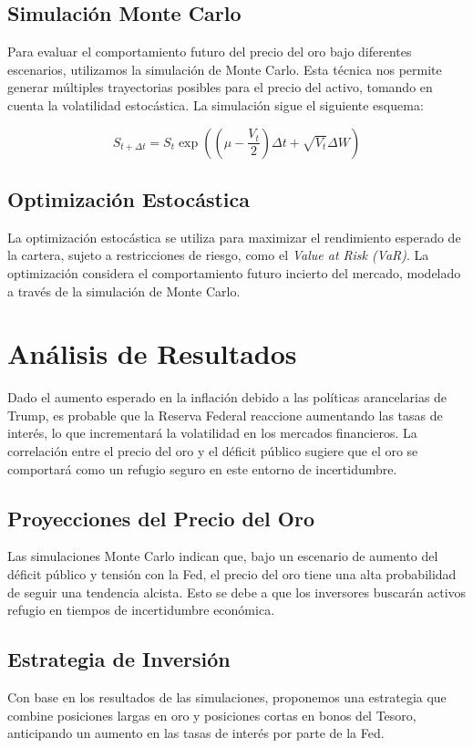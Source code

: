 \documentclass{article}
\begin{document}
\subsection{Simulación Monte Carlo}
Para evaluar el comportamiento futuro del precio del oro bajo diferentes escenarios, utilizamos la simulación de Monte Carlo. Esta técnica nos permite generar múltiples trayectorias posibles para el precio del activo, tomando en cuenta la volatilidad estocástica. La simulación sigue el siguiente esquema:

\[
S_{t+\Delta t} = S_t \exp \left( \left( \mu - \frac{V_t}{2} \right) \Delta t + \sqrt{V_t} \Delta W \right)
\]

\subsection{Optimización Estocástica}
La optimización estocástica se utiliza para maximizar el rendimiento esperado de la cartera, sujeto a restricciones de riesgo, como el \textit{Value at Risk (VaR)}. La optimización considera el comportamiento futuro incierto del mercado, modelado a través de la simulación de Monte Carlo.

\section{Análisis de Resultados}

Dado el aumento esperado en la inflación debido a las políticas arancelarias de Trump, es probable que la Reserva Federal reaccione aumentando las tasas de interés, lo que incrementará la volatilidad en los mercados financieros. La correlación entre el precio del oro y el déficit público sugiere que el oro se comportará como un refugio seguro en este entorno de incertidumbre.

\subsection{Proyecciones del Precio del Oro}
Las simulaciones Monte Carlo indican que, bajo un escenario de aumento del déficit público y tensión con la Fed, el precio del oro tiene una alta probabilidad de seguir una tendencia alcista. Esto se debe a que los inversores buscarán activos refugio en tiempos de incertidumbre económica.

\subsection{Estrategia de Inversión}
Con base en los resultados de las simulaciones, proponemos una estrategia que combine posiciones largas en oro y posiciones cortas en bonos del Tesoro, anticipando un aumento en las tasas de interés por parte de la Fed.
\end{document}

